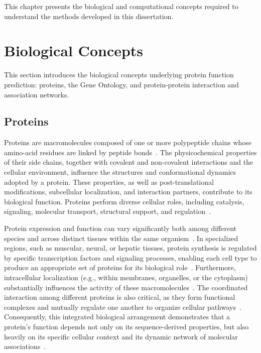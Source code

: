 \documentclass[Ingles]{ic-tese-v3}
\begin{document}
This chapter presents the biological and computational concepts required to understand the methods developed in this dissertation.

\section{Biological Concepts}

This section introduces the biological concepts underlying protein function prediction: proteins, the Gene Ontology, and protein-protein interaction and association networks.

\subsection{Proteins}

Proteins are macromolecules composed of one or more polypeptide chains whose amino-acid residues are linked by peptide bonds~\cite{satyanarayana2013biochemistry, voet2008principles}. The physicochemical properties of their side chains, together with covalent and non-covalent interactions and the cellular environment, influence the structures and conformational dynamics adopted by a protein. These properties, as well as post-translational modifications, subcellular localization, and interaction partners, contribute to its biological function. Proteins perform diverse cellular roles, including catalysis, signaling, molecular transport, structural support, and regulation~\cite{anfinsen_dogma}.

Protein expression and function can vary significantly both among different species and across distinct tissues within the same organism~\cite{uhlen2015tissue}. In specialized regions, such as muscular, neural, or hepatic tissues, protein synthesis is regulated by specific transcription factors and signaling processes, enabling each cell type to produce an appropriate set of proteins for its biological role~\cite{alberts2022molecular}. Furthermore, intracellular localization (e.g., within membranes, organelles, or the cytoplasm) substantially influences the activity of these macromolecules~\cite{thul2017subcellular}. The coordinated interaction among different proteins is also critical, as they form functional complexes and mutually regulate one another to organize cellular pathways~\cite{barabasi2004network}. Consequently, this integrated biological arrangement demonstrates that a protein's function depends not only on its sequence-derived properties, but also heavily on its specific cellular context and its dynamic network of molecular associations~\cite{voet2008principles}.
\end{document}
